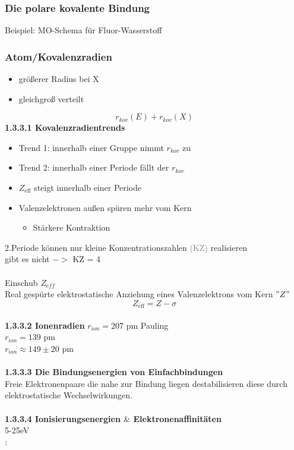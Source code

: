 \documentclass{article}
\begin{document}
\subsubsection{Die polare kovalente Bindung}
Beispiel: MO-Schema für Fluor-Wasserstoff
\subsubsection{Atom/Kovalenzradien}
\begin{itemize}
    \item größerer Radius bei X
\end{itemize}
\begin{itemize}
    \item gleichgroß verteilt
\end{itemize}
\begin{equation*}
    r_{kov}(E)+r_{kov}(X)
\end{equation*}
\textbf{1.3.3.1 Kovalenzradientrends}\\
\begin{itemize}
    \item Trend 1: innerhalb einer Gruppe nimmt $r_{kov}$ zu 
    \item Trend 2: innerhalb einer Periode fällt der $r_{kov}$
    \item $Z_{\mathrm{eff}}$ steigt innerhalb einer Periode
    \item Valenzelektronen außen spüren mehr vom Kern 
    \begin{itemize}
        \item Stärkere Kontraktion
    \end{itemize}
\end{itemize}
2.Periode  können nur kleine Konzentrationszahlen \textcolor{gray}{(KZ)} realisieren\\
\hspace*{1cm}  gibt es nicht $->$ KZ = 4\\\\
Einschub $Z_{eff}$\\
Real gespürte elektrostatische Anziehung eines Valenzelektrons vom Kern $"Z"$\\
\begin{equation*}
    Z_{\mathrm{eff}} = Z-\sigma
\end{equation*}
\\
\textbf{1.3.3.2 Ionenradien}
$r_{ion}=207$ pm Pauling\\
$r_{ion}=139$ pm\\
$r_{ion}\approx 149 \pm 20$ pm\\\\
\textbf{1.3.3.3 Die Bindungsenergien von  Einfachbindungen}\\
Freie Elektronenpaare die nahe zur Bindung liegen destabilisieren diese durch elektrostatische Wechselwirkungen.\\\\
\textbf{1.3.3.4 Ionisierungsenergien $\&$ Elektronenaffinitäten}\\
  5-25eV\\
: 
\end{document}
